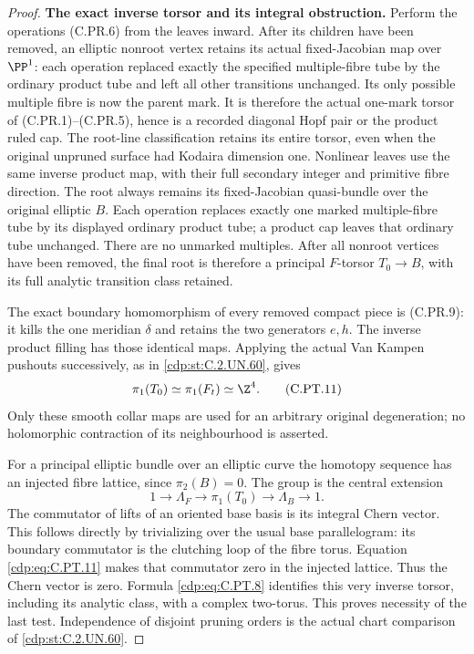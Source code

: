 \begin{proof}
\par\medskip\noindent\textbf{The exact inverse torsor and its integral obstruction.}
Perform the operations (C.PR.6) from the leaves
inward. After its children have been removed,
an elliptic nonroot vertex retains its actual
fixed-Jacobian map over $\PP^1$: each operation
replaced exactly the specified multiple-fibre
tube by the ordinary product tube and left
all other transitions unchanged. Its only
possible multiple fibre is now the parent
mark. It is therefore the actual one-mark
torsor of (C.PR.1)--(C.PR.5), hence is a
recorded diagonal Hopf pair or the product
ruled cap. The root-line classification retains
its entire torsor, even when the original
unpruned surface had Kodaira dimension one.
Nonlinear leaves use the same
inverse product map, with their full
secondary integer and primitive fibre
direction. The root always remains its
fixed-Jacobian quasi-bundle over the original
elliptic $B$. Each operation replaces exactly
one marked multiple-fibre tube by its
displayed ordinary product tube; a product
cap leaves that ordinary tube unchanged.
There are no unmarked multiples. After all
nonroot vertices have been removed, the final
root is therefore a principal $F$-torsor
$T_0\to B$, with its full analytic transition
class retained.

The exact boundary homomorphism of every
removed compact piece is (C.PR.9): it kills
the one meridian $\delta$ and retains the
two generators $e,h$. The inverse product
filling has those identical maps. Applying
the actual Van Kampen pushouts successively,
as in \ref{cdp:st:C.2.UN.60}, gives
\[
                         \pi_1(T_0)\simeq\pi_1(F_t)
                                             \simeq\Z^4.
 \tag{C.PT.11}\label{cdp:eq:C.PT.11}
\]
Only these smooth collar maps are used for
an arbitrary original degeneration; no
holomorphic contraction of its neighbourhood
is asserted.

For a principal elliptic bundle over an
elliptic curve the homotopy sequence has
an injected fibre lattice, since
$\pi_2(B)=0$. The group is the central
extension
\[
 1\longrightarrow\Lambda_F
 \longrightarrow\pi_1(T_0)
 \longrightarrow\Lambda_B\longrightarrow1.
 \tag{C.PT.12}\label{cdp:eq:C.PT.12}
\]
The commutator of lifts of an oriented
base basis is its integral Chern vector.
This follows directly by trivializing over
the usual base parallelogram: its boundary
commutator is the clutching loop of the
fibre torus. Equation \eqref{cdp:eq:C.PT.11} makes that
commutator zero in the injected lattice.
Thus the Chern vector is zero. Formula
\eqref{cdp:eq:C.PT.8} identifies this very inverse
torsor, including its analytic class,
with a complex two-torus. This proves
necessity of the last test. Independence
of disjoint pruning orders is the actual
chart comparison of \ref{cdp:st:C.2.UN.60}.


\end{proof}
